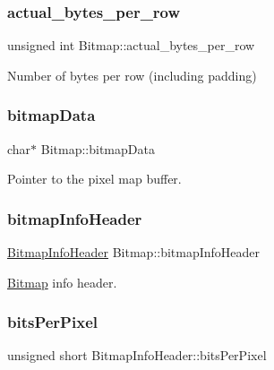\subsubsection{\texorpdfstring{actual\+\_\+bytes\+\_\+per\+\_\+row}{actual\_bytes\_per\_row}}
{\footnotesize\ttfamily unsigned int Bitmap\+::actual\+\_\+bytes\+\_\+per\+\_\+row}



Number of bytes per row (including padding) 

\mbox{\label{group__bitmap_gad3fa2b9ac8c411719d9c261f41a999f9}} 
\subsubsection{\texorpdfstring{bitmap\+Data}{bitmapData}}
{\footnotesize\ttfamily char$\ast$ Bitmap\+::bitmap\+Data}



Pointer to the pixel map buffer. 

\mbox{\label{group__bitmap_ga95c481a5ce1ff4af08cd135ca4af120b}} 
\subsubsection{\texorpdfstring{bitmap\+Info\+Header}{bitmapInfoHeader}}
{\footnotesize\ttfamily \mbox{\hyperlink{struct_bitmap_info_header}{Bitmap\+Info\+Header}} Bitmap\+::bitmap\+Info\+Header}



\mbox{\hyperlink{struct_bitmap}{Bitmap}} info header. 

\mbox{\label{group__bitmap_ga2a1eb136325c8cb16aeeb7108703702f}} 
\subsubsection{\texorpdfstring{bits\+Per\+Pixel}{bitsPerPixel}}
{\footnotesize\ttfamily unsigned short Bitmap\+Info\+Header\+::bits\+Per\+Pixel}



